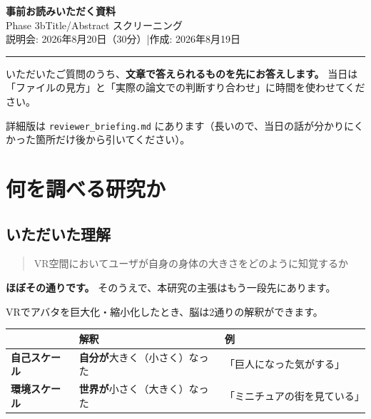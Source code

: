 \documentclass[a4paper]{ltjsarticle}
\begin{document}
\begin{center}
  {\LARGE\bfseries\color{accent} 事前お読みいただく資料}\\[4pt]
  {\large Phase 3b\quad Title/Abstract スクリーニング}\\[10pt]
  {\small 説明会: 2026年8月20日（30分）\quad|\quad 作成: 2026年8月19日}
\end{center}

\vspace{4pt}
\noindent\textcolor{rule}{\rule{\linewidth}{0.8pt}}
\vspace{6pt}

\noindent
いただいたご質問のうち、\textbf{文章で答えられるものを先にお答えします。}
当日は「ファイルの見方」と「実際の論文での判断すり合わせ」に時間を使わせてください。

\noindent
詳細版は \texttt{reviewer\_briefing.md} にあります（長いので、当日の話が分かりにくかった箇所だけ後から引いてください）。

\section{何を調べる研究か}

\subsection*{いただいた理解}

\begin{quote}
VR空間においてユーザが自身の身体の大きさをどのように知覚するか
\end{quote}

\noindent
\textbf{ほぼその通りです。} そのうえで、本研究の主張はもう一段先にあります。

\medskip
\noindent
VRでアバタを巨大化・縮小化したとき、脳は2通りの解釈ができます。

\begin{center}
\begin{tabularx}{\linewidth}{L{7em} L{13em} X}
\toprule
 & 解釈 & 例 \\
\midrule
\textbf{自己スケール} & \textbf{自分が}大きく（小さく）なった & 「巨人になった気がする」 \\
\textbf{環境スケール} & \textbf{世界が}小さく（大きく）なった & 「ミニチュアの街を見ている」 \\
\bottomrule
\end{tabularx}
\end{center}
\end{document}
